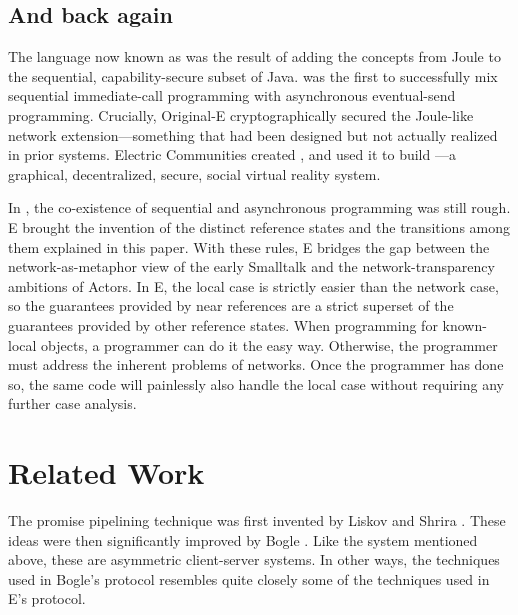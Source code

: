 \documentclass{llncs}
\begin{document}
\subsection{And back again}

 The language now known as  was
the result of adding the concepts from Joule to the sequential,
capability-secure subset of Java.  was the first to
successfully mix sequential immediate-call programming with
asynchronous eventual-send programming. Crucially, Original-E
cryptographically secured the Joule-like network extension---something
that had been designed but not actually realized in prior systems.
Electric Communities created , and used it to build
---a graphical, decentralized, secure, social virtual
reality system.

 In , the co-existence
of sequential and asynchronous programming was still rough. E brought
the invention of the distinct reference states and the transitions
among them explained in this paper. With these rules, E bridges the
gap between the network-as-metaphor view of the early Smalltalk and
the network-transparency ambitions of Actors. In E, the local case is
strictly easier than the network case, so the guarantees provided by
near references are a strict superset of the guarantees provided by
other reference states. When programming for known-local objects, a
programmer can do it the easy way. Otherwise, the programmer must
address the inherent problems of networks.  Once the programmer has
done so, the same code will painlessly also handle the local case
without requiring any further case analysis.

\section{Related Work}

 The promise
pipelining technique was first invented by Liskov and Shrira
\cite{liskov:promises}. These ideas were then significantly improved
by Bogle \cite{bogle:batched}. Like the  system
mentioned above, these are asymmetric client-server systems. In other
ways, the techniques used in Bogle's protocol resembles quite closely
some of the techniques used in E's protocol.

\end{document}
